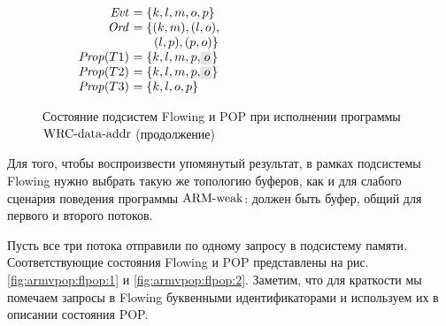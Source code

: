 \begin{figure}
  \begin{subfigure}{.5\textwidth}
\begin{center}
\end{center}
    \caption{}
    \label{fig:armvpop:flpop:11} 
  \end{subfigure}%
  \begin{subfigure}{.5\textwidth}
\begin{center}
\parbox{63mm}{$\begin{array}{@{}r@{~}l@{}}
  \Evt      &= \{k, l, m, o, p\} \\
  \Ord      &= \{ (k, m), (l, o), \\
            & ~~\quad (l, p), (p, o) \} \\
  \Prop(T1) &= \{k, l, m, p, \graybox{o}\} \\
  \Prop(T2) &= \{k, l, m, p, \graybox{o}\} \\
  \Prop(T3) &= \{k, l, o, p\} \\
\end{array}$}
\end{center}
    \caption{}
    \label{fig:armvpop:flpop:12}
  \end{subfigure}

  \caption{Состояние подсистем Flowing и POP при исполнении программы ${\rm WRC\text{-}data\text{-}addr}$ (продолжение)}
  \label{fig:armvpop:flpop}
\end{figure}

Для того, чтобы воспроизвести упомянутый результат, в рамках подсистемы Flowing нужно
выбрать такую же топологию буферов, как и для слабого сценария поведения программы
${\rm ARM\text{-}weak}$: должен быть буфер, общий для первого и второго потоков.

Пусть все три потока отправили по одному запросу в подсистему памяти.
Соответствующие состояния Flowing и POP представлены на
рис. \ref{fig:armvpop:flpop:1} и \ref{fig:armvpop:flpop:2}.
Заметим, что для краткости мы помечаем запросы в Flowing буквенными
идентификаторами и используем их в описании состояния POP.


